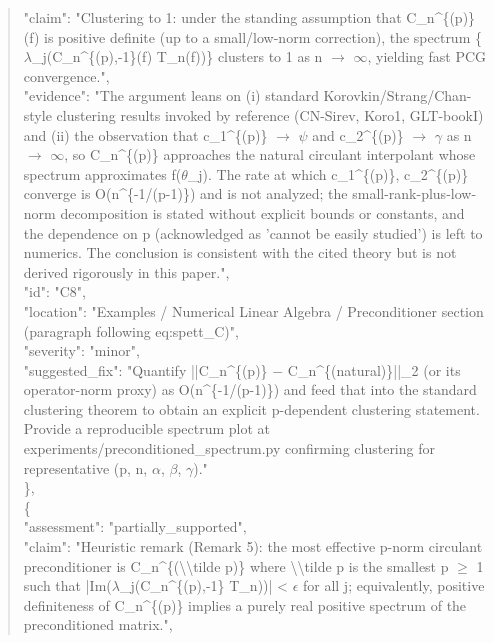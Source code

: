 \documentclass[11pt]{article}
\begin{document}
\begin{quote}
      "claim": "Clustering to 1: under the standing assumption that C\_n\^{}\{(p)\}(f) is positive definite (up to a small/low-norm correction), the spectrum \{\ensuremath{\lambda}\_j(C\_n\^{}\{(p),-1\}(f) T\_n(f))\} clusters to 1 as n \ensuremath{\to} \ensuremath{\infty}, yielding fast PCG convergence.",\\
      "evidence": "The argument leans on (i) standard Korovkin/Strang/Chan-style clustering results invoked by reference (CN-Sirev, Koro1, GLT-bookI) and (ii) the observation that c\_1\^{}\{(p)\} \ensuremath{\to} \ensuremath{\psi} and c\_2\^{}\{(p)\} \ensuremath{\to} \ensuremath{\gamma} as n \ensuremath{\to} \ensuremath{\infty}, so C\_n\^{}\{(p)\} approaches the natural circulant interpolant whose spectrum approximates f(\ensuremath{\theta}\_j). The rate at which c\_1\^{}\{(p)\}, c\_2\^{}\{(p)\} converge is O(n\^{}\{-1/(p-1)\}) and is not analyzed; the small-rank-plus-low-norm decomposition is stated without explicit bounds or constants, and the dependence on p (acknowledged as 'cannot be easily studied') is left to numerics. The conclusion is consistent with the cited theory but is not derived rigorously in this paper.",\\
      "id": "C8",\\
      "location": "Examples / Numerical Linear Algebra / Preconditioner section (paragraph following eq:spett\_C)",\\
      "severity": "minor",\\
      "suggested\_fix": "Quantify ||C\_n\^{}\{(p)\} \ensuremath{-} C\_n\^{}\{(natural)\}||\_2 (or its operator-norm proxy) as O(n\^{}\{-1/(p-1)\}) and feed that into the standard clustering theorem to obtain an explicit p-dependent clustering statement. Provide a reproducible spectrum plot at experiments/preconditioned\_spectrum.py confirming clustering for representative (p, n, \ensuremath{\alpha}, \ensuremath{\beta}, \ensuremath{\gamma})."\\
    \},\\
    \{\\
      "assessment": "partially\_supported",\\
      "claim": "Heuristic remark (Remark 5): the most effective p-norm circulant preconditioner is C\_n\^{}\{(\textbackslash{}\textbackslash{}tilde p)\} where \textbackslash{}\textbackslash{}tilde p is the smallest p \ensuremath{\ge} 1 such that |Im(\ensuremath{\lambda}\_j(C\_n\^{}\{(p),-1\} T\_n))| < \ensuremath{\epsilon} for all j; equivalently, positive definiteness of C\_n\^{}\{(p)\} implies a purely real positive spectrum of the preconditioned matrix.",\\

\end{quote}
\end{document}
